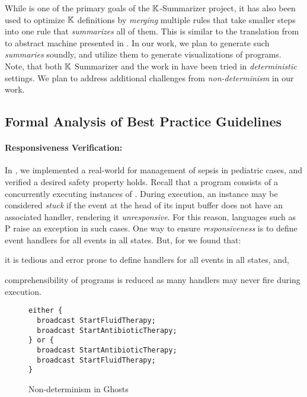 While \SBC{} is one of the primary goals of the $\mathbb{K}{}$-Summarizer
project, it has also been used to optimize $\mathbb{K}$ definitions
by \emph{merging} multiple rules that take smaller steps into
one rule that \emph{summarizes} all of them. This is similar
to the translation from \SOS{} to abstract machine presented in
\cite{KoppelICFP22}. In our work, we plan to generate such
\emph{summaries} soundly, and utilize them to generate visualizations
of \MediK{} programs. Note, that both $\mathbb{K}$ Summarizer and the work
in \cite{KoppelICFP22} have been tried in \emph{deterministic} settings.
We plan to address additional challenges from \emph{non-determinism} in our
work.

\subsection{Formal Analysis of Best Practice Guidelines}\label{subsec:formal-analysis}

\paragraph{Responsiveness Verification:}

In \cite{SaxenaFMCAD23}, we implemented a real-world \CDSS{} for management of
sepsis in pediatric cases, and verified a desired safety property holds.
Recall that a \MediK{} program consists of a concurrently executing instances
of \FSMs{}. During execution, an instance may be considered \emph{stuck} if
the event at the head of its input buffer does not have an associated handler,
rendering it \emph{unresponsive}. For this reason, languages such as P
\cite{DesaiPLDI13} raise an exception in such cases. One way to ensure
\emph{responsiveness} is to define event handlers for all events
in all states. But, for \MediK{} we found that:
\begin{enumerate*}[label=(\alph*)]
  \item it is tedious and error prone to define handlers for all events in all
  states, and,
  \item comprehensibility of programs is reduced as many handlers may never fire
  during execution.
\end{enumerate*}

\begin{wrapfigure}{r}{0.42\textwidth}
\begin{lstlisting}[style=mediksty
,language=medik
,basicstyle=\ttfamily\scriptsize
,numberstyle=\tiny
,framexleftmargin=1.5em
,xleftmargin=2em
]
either {
  broadcast StartFluidTherapy;
  broadcast StartAntibioticTherapy;
} or {
  broadcast StartAntibioticTherapy;
  broadcast StartFluidTherapy;
}
\end{lstlisting}
  \caption{Non-determinism in \MediK{} Ghosts}\label{fig:non-determinism}
\end{wrapfigure}

